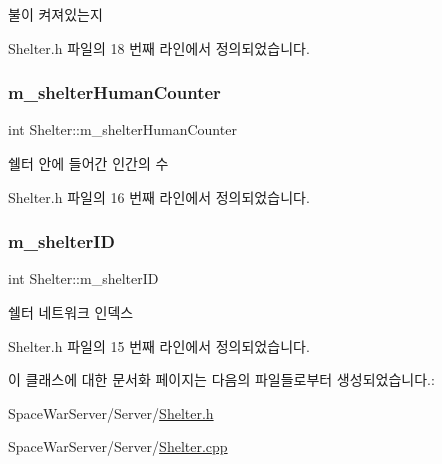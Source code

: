 불이 켜져있는지 



Shelter.\+h 파일의 18 번째 라인에서 정의되었습니다.

\mbox{\label{class_shelter_a31a7132fc38ce768924bb59302d02d82}} 
\subsubsection{\texorpdfstring{m\+\_\+shelter\+Human\+Counter}{m\_shelterHumanCounter}}
{\footnotesize\ttfamily int Shelter\+::m\+\_\+shelter\+Human\+Counter\hspace{0.3cm}{\ttfamily [private]}}



쉘터 안에 들어간 인간의 수 



Shelter.\+h 파일의 16 번째 라인에서 정의되었습니다.

\mbox{\label{class_shelter_a158439448d67e4991a19dd7175a78a0b}} 
\subsubsection{\texorpdfstring{m\+\_\+shelter\+ID}{m\_shelterID}}
{\footnotesize\ttfamily int Shelter\+::m\+\_\+shelter\+ID\hspace{0.3cm}{\ttfamily [private]}}



쉘터 네트워크 인덱스 



Shelter.\+h 파일의 15 번째 라인에서 정의되었습니다.



이 클래스에 대한 문서화 페이지는 다음의 파일들로부터 생성되었습니다.\+:\begin{DoxyCompactItemize}
\item 
Space\+War\+Server/\+Server/\hyperlink{_shelter_8h}{Shelter.\+h}\item 
Space\+War\+Server/\+Server/\hyperlink{_shelter_8cpp}{Shelter.\+cpp}\end{DoxyCompactItemize}

